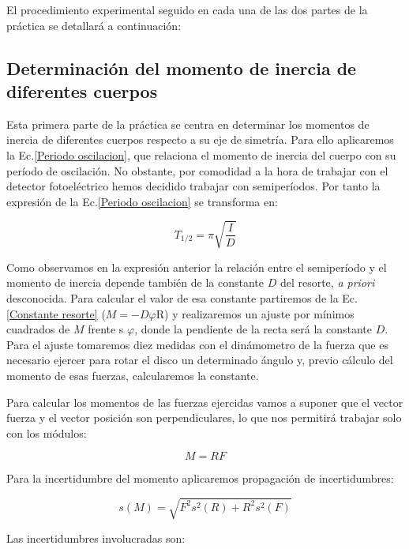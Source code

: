 \documentclass[a4paper,12pt,titlepage]{article}
\begin{document}
\newpage

El procedimiento experimental seguido en cada una de las dos partes de la práctica se detallará a continuación:

\subsection{Determinación del momento de inercia de diferentes cuerpos}

Esta primera parte de la práctica se centra en determinar los momentos de inercia de diferentes cuerpos respecto a su eje de simetría. Para ello aplicaremos la Ec.\ref{Periodo oscilacion}, que relaciona el momento de inercia del cuerpo con su período de oscilación. No obstante, por comodidad a la hora de trabajar con el detector fotoeléctrico hemos decidido trabajar con semiperíodos. Por tanto la expresión de la Ec.\ref{Periodo oscilacion} se transforma en:

\begin{equation}
    T_{1/2} = \pi \sqrt{\frac{I}{D}}
    \label{SemiT osc}
\end{equation}

Como observamos en la expresión anterior la relación entre el semiperíodo y el momento de inercia depende también de la constante $D$ del resorte, \textit{a priori} desconocida. Para calcular el valor de esa constante partiremos de la Ec.\ref{Constante resorte} ($M=-D\varphi$R) y realizaremos un ajuste por mínimos cuadrados de $M$ frente s $\varphi$, donde la pendiente de la recta será la constante $D$. Para el ajuste tomaremos diez medidas con el dinámometro de la fuerza que es necesario ejercer para rotar el disco un determinado ángulo y, previo cálculo del momento de esas fuerzas, calcularemos la constante.

\par Para calcular los momentos de las fuerzas ejercidas vamos a suponer que el vector fuerza y el vector posición son perpendiculares, lo que nos permitirá trabajar solo con los módulos:

\begin{equation}
    M=RF
\end{equation}

Para la incertidumbre del momento aplicaremos propagación de incertidumbres:

\begin{equation}
    s(M) = \sqrt{F^2s^2(R)+R^2s^2(F)}
\end{equation}

Las incertidumbres involucradas son:
\end{document}
